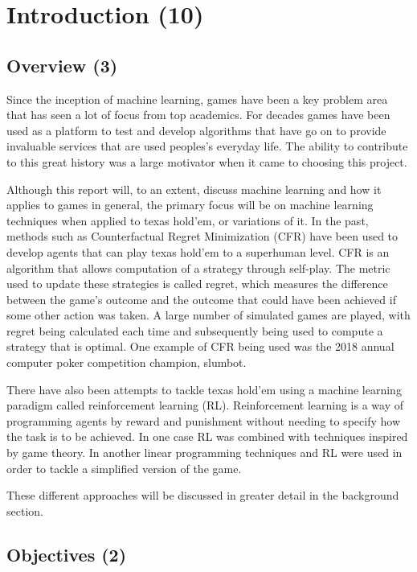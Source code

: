 \chapter{Introduction (10)}
\label{ch:intro}

\section{Overview (3)}\label{sec:overview}
Since the inception of machine learning, games have been a key problem area that has seen a lot of focus from
top academics.
For decades games have been used as a platform to test and develop algorithms that have go on to provide invaluable
services that are used peoples's everyday life.
The ability to contribute to this great history was a large motivator when it came to choosing this project.

Although this report will, to an extent, discuss machine learning and how it applies to games in general, the
primary focus will be on machine learning techniques when applied to texas hold'em, or variations of it.
In the past, methods such as Counterfactual Regret Minimization (CFR) have been used to develop agents that can
play texas hold'em to a superhuman level.
CFR is an algorithm that allows computation of a strategy through self-play.
The metric used to update these strategies is called regret, which measures the difference between the
game's outcome and the outcome that could have been achieved if some other action was taken.
A large number of simulated games are played, with regret being calculated each time and subsequently being used
to compute a strategy that is optimal.
One example of CFR being used was the 2018 annual computer poker competition champion, slumbot\citep{jackson2013slumbot}.

There have also been attempts to tackle texas hold'em using a machine learning paradigm called reinforcement
learning (RL).
Reinforcement learning is a way of programming agents by reward and punishment without needing to specify how the
task is to be achieved\citep{kaelbling1996reinforcement}.
In one case RL was combined with techniques inspired by game theory\citep{heinrich2016deep}.
In another linear programming techniques and RL were used in order to tackle a
simplified version of the game\citep{dahl2001reinforcement}.

These different approaches will be discussed in greater detail in the background section.

\section{Objectives (2)}\label{sec:objectives}
